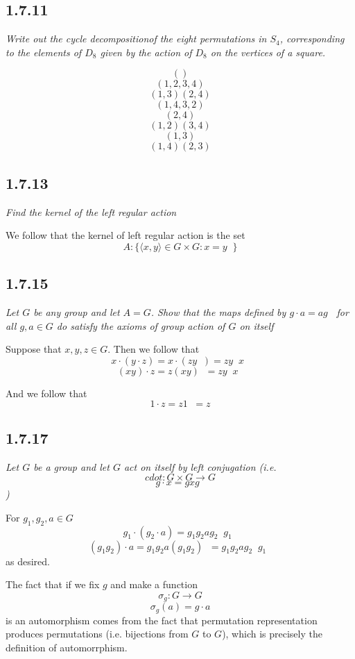 \documentclass[11pt,oneside,titlepage]{book}
\DeclareMathOperator \inv {^{-1}}
\newcommand{\eangle}[1]{\langle #1 \rangle}
\begin{document}
\subsection{1.7.11}

\textit{Write out the cycle decompositionof the eight permutations in $S_4$, corresponding
  to the elements of $D_8$ given by the action of $D_8$ on the vertices of a square.}

$$()$$
$$(1, 2, 3, 4)$$
$$(1, 3)(2, 4)$$
$$(1, 4, 3, 2)$$
$$(2, 4)$$
$$(1, 2)(3, 4)$$
$$(1, 3)$$
$$(1, 4)(2, 3)$$

\subsection{1.7.13}

\textit{Find the kernel of the left regular action}

We follow that the kernel of left regular action is the set
$$A: \{\eangle{x, y} \in G \times G: x = y\inv\}$$

\subsection*{1.7.15}

\textit{Let $G$ be any group and let $A = G$. Show that the maps defined by
  $g \cdot a = a g \inv$ for all $g, a \in G$ do satisfy the axioms of group action
  of $G$ on itself}

Suppose that $x, y, z \in G$. Then we follow that
$$x \cdot (y \cdot z) = x \cdot (z y \inv) = z y\inv x \inv$$
$$(x y) \cdot z = z (x y) \inv = z y \inv x \inv$$

And we follow that
$$1 \cdot z = z  1 \inv = z$$


\subsection*{1.7.17}

\textit{Let $G$ be a group and let $G$ act on itself by left conjugation (i.e.
  $$cdot: G \times G \to G$$
  $$g \cdot x = g x g \inv$$
  )
}

For $g_1, g_2, a \in G$
$$g_1 \cdot (g_2 \cdot a) = g_1 g_2 a g_2 \inv g_1 \inv$$
$$(g_1g_2) \cdot a = g_1 g_2 a (g_1 g_2)\inv = g_1 g_2 a g_2 \inv g_1 \inv $$
as desired.

The fact that if we fix $g$ and make a function
$$\sigma_g: G \to G$$
$$\sigma_g(a) = g \cdot a$$
is an automorphism comes from the fact that permutation representation produces permutations
(i.e. bijections from $G$ to $G$), which is precisely the definition of automorrphism.
\end{document}
